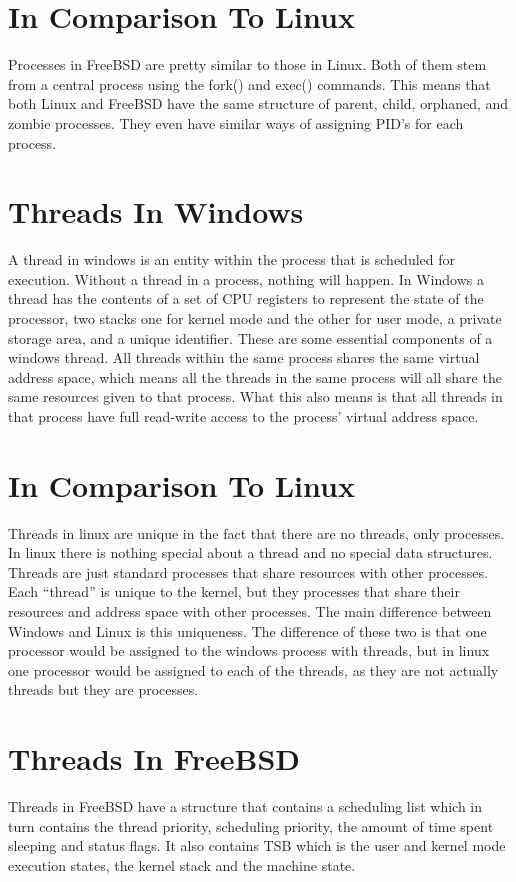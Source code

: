 \documentclass[onecolumn, draftclsnofoot, 10pt, titlepage, compsoc]{IEEEtran}
\begin{document}
\section{In Comparison To Linux}
Processes in FreeBSD are pretty similar to those in Linux. Both of them stem from a central process using the fork() and exec() commands. This means that both Linux and FreeBSD have the same structure of parent, child, orphaned, and zombie processes. They even have similar ways of assigning PID’s for each process.

\section{Threads In Windows}
A thread in windows is an entity within the process that is scheduled for execution. Without a thread in a process, nothing will happen. In Windows a thread has the contents of a set of CPU registers to represent the state of the processor, two stacks one for kernel mode and the other for user mode, a private storage area, and a unique identifier. These are some essential components of a windows thread. All threads within the same process shares the same virtual address space, which means all the threads in the same process will all share the same resources given to that process. What this also means is that all threads in that process have full read-write access to the process’ virtual address space.
\section{In Comparison To Linux}
Threads in linux are unique in the fact that there are no threads, only processes. In linux there is nothing special about a thread and no special data structures. Threads are just standard processes that share resources with other processes. Each “thread” is unique to the kernel, but they processes that share their resources and address space with other processes. The main difference between Windows and Linux is this uniqueness. The difference of these two is that one processor would be assigned to the windows process with threads, but in linux one processor would be assigned to each of the threads, as they are not actually threads but they are processes.
\section{Threads In FreeBSD}
Threads in FreeBSD have a structure that contains a scheduling list which in turn contains the thread priority, scheduling priority, the amount of time spent sleeping and status flags. It also contains TSB which is the user and kernel mode execution states, the kernel stack and the machine state.
\end{document}
